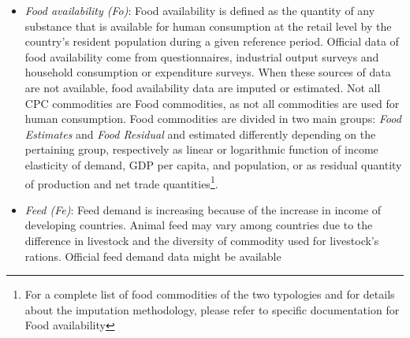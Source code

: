 \documentclass[]{article}
\let\rmarkdownfootnote\footnote%
\def\footnote{\protect\rmarkdownfootnote}
\begin{document}
\begin{itemize}
  considered as a utilization for that commodity. Changes in stocks are
  typically limited to a short number of commodities, mainly grains,
  pulses and sugar and, because they are very rarely measured by
  country, figures are very often imputed or estimated\footnote{For a
    complete list of stock commodities and for details about the
    imputation methodology, please refer to specific documentation for
    stock}. Estimation of \emph{changes in stock} is based on opening
  stocks figures through an approach that maintain time consistency of
  available data and official data\footnote{All data are marked as
    \emph{official}, \emph{semi-official} or \emph{unofficial},
    depending on the source they come from, through \emph{flags}. Flag
    management is one of the core responsibilities of the \emph{Office
    of the Chief Statistician} Department in FAO. Flags are used from
    all the estimation procedure for distinguishing between different
    level of reliability in the data. The most reliable data are used to
    estimate missing or less reliable data.{[}this has to be better
    specified{]}}.
\item
  \emph{Food availability (Fo)}: Food availability is defined as the
  quantity of any substance that is available for human consumption at
  the retail level by the country's resident population during a given
  reference period. Official data of food availability come from
  questionnaires, industrial output surveys and household consumption or
  expenditure surveys. When these sources of data are not available,
  food availability data are imputed or estimated. Not all CPC
  commodities are Food commodities, as not all commodities are used for
  human consumption. Food commodities are divided in two main groups:
  \emph{Food Estimates} and \emph{Food Residual} and estimated
  differently depending on the pertaining group, respectively as linear
  or logarithmic function of income elasticity of demand, GDP per
  capita, and population, or as residual quantity of production and net
  trade quantities\footnote{For a complete list of food commodities of
    the two typologies and for details about the imputation methodology,
    please refer to specific documentation for Food availability}.
\item
  \emph{Feed (Fe)}: Feed demand is increasing because of the increase in
  income of developing countries. Animal feed may vary among countries
  due to the difference in livestock and the diversity of commodity used
  for livestock's rations. Official feed demand data might be available

\end{itemize}
\end{document}
